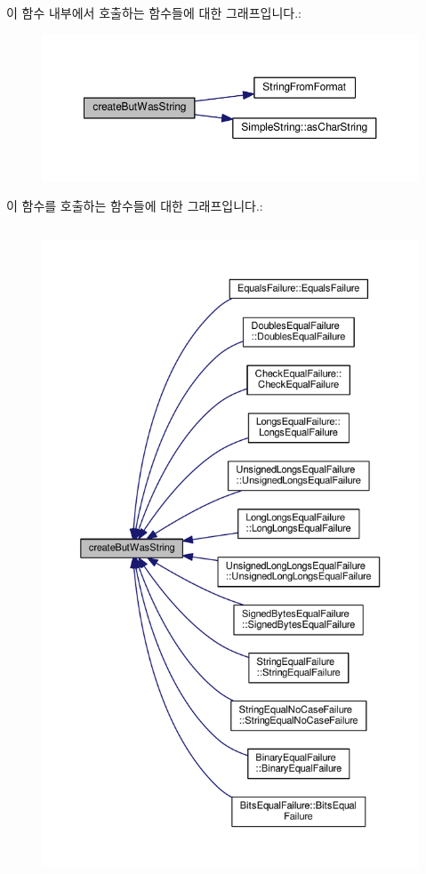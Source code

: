 이 함수 내부에서 호출하는 함수들에 대한 그래프입니다.\+:
\nopagebreak
\begin{figure}[H]
\begin{center}
\leavevmode
\includegraphics[width=350pt]{class_test_failure_a14e11a7282409ba8fb985ab58c983856_cgraph}
\end{center}
\end{figure}




이 함수를 호출하는 함수들에 대한 그래프입니다.\+:
\nopagebreak
\begin{figure}[H]
\begin{center}
\leavevmode
\includegraphics[height=550pt]{class_test_failure_a14e11a7282409ba8fb985ab58c983856_icgraph}
\end{center}
\end{figure}


